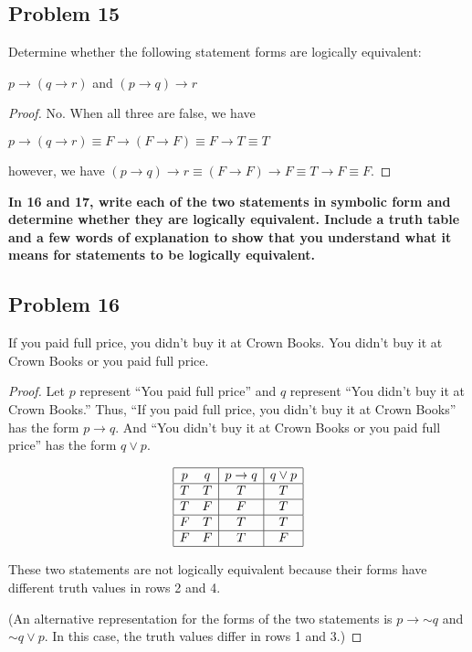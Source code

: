 \documentclass[14pt]{extarticle}
\begin{document}
\subsection{Problem 15}
Determine whether the following statement forms are logically equivalent:

$p \to (q \to r)$ and $(p \to q) \to r$

\begin{proof}
No. When all three are false, we have

$p \to (q \to r) \equiv F \to (F \to F) \equiv F \to T \equiv T$

however, we have $(p \to q) \to r \equiv (F \to F) \to F \equiv T \to F \equiv F$.
\end{proof}

{\bf In 16 and 17, write each of the two statements in symbolic form and determine whether they are logically equivalent. Include a truth table and a few words of explanation to show that you understand what it means for statements to be logically equivalent.}

\subsection{Problem 16}
If you paid full price, you didn’t buy it at Crown Books. You didn’t buy it at Crown Books or you paid full price.

\begin{proof}
Let $p$ represent “You paid full price” and $q$ represent “You didn’t buy it at Crown Books.” Thus, “If you paid full price, you didn’t buy it at Crown Books” has the form $p \to q$. And “You didn’t buy it at Crown Books or you paid full price” has the form $q \vee p$.

$$
\begin{array}{|cc|c|c|}
\hline
p & q & p \to q & q \vee p \\
\hline
T & T & T & T \\
\hline
T & F & F & T \\
\hline
F & T & T & T \\
\hline
F & F & T & F \\
\hline
\end{array}
$$

These two statements are not logically equivalent because their forms have different truth values in rows 2 and 4.

(An alternative representation for the forms of the two statements is $p \to {\sim q}$ and ${\sim q} \vee p$. In this case, the truth values differ in rows 1 and 3.)
\end{proof}
\end{document}
